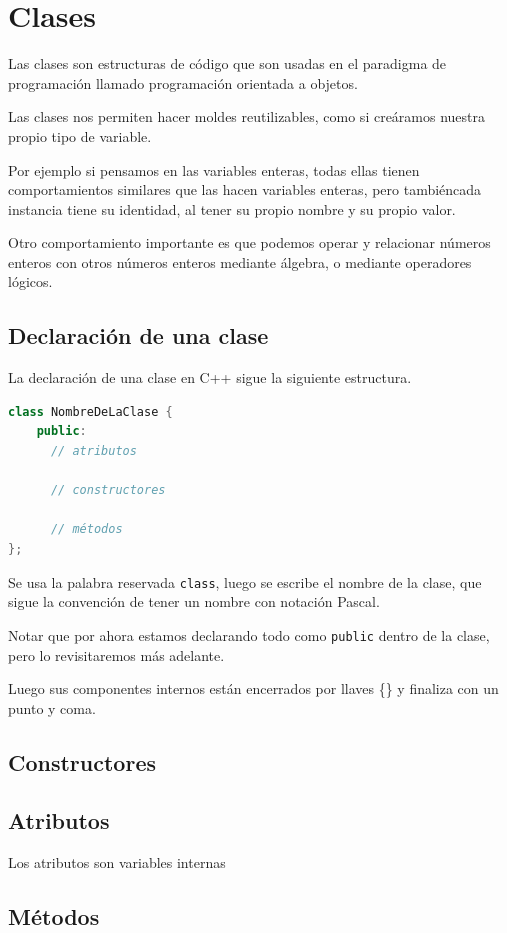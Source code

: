 \documentclass[../principal.tex]{subfiles}
\begin{document}
\chapter{Clases}

Las clases son estructuras de código que son usadas en el paradigma de programación llamado programación orientada a objetos.

Las clases nos permiten hacer moldes reutilizables, como si creáramos nuestra propio tipo de variable.

Por ejemplo si pensamos en las variables enteras, todas ellas tienen comportamientos similares que las hacen variables enteras, pero tambiéncada instancia tiene su identidad, al tener su propio nombre y su propio valor.

Otro comportamiento importante es que podemos operar y relacionar números enteros con otros números enteros mediante álgebra, o mediante operadores lógicos.

\section{Declaración de una clase}

La declaración de una clase en C++ sigue la siguiente estructura.

\begin{lstlisting}[language=C++]
class NombreDeLaClase {
    public:
      // atributos

      // constructores

      // métodos
};
\end{lstlisting}

Se usa la palabra reservada \lstinline{class}, luego se escribe el nombre de la clase, que sigue la convención de tener un nombre con notación Pascal.

Notar que por ahora estamos declarando todo como \lstinline{public} dentro de la clase, pero lo revisitaremos más adelante.

Luego sus componentes internos están encerrados por llaves \{\} y finaliza con un punto y coma.

\section{Constructores}

\section{Atributos}

Los atributos son variables internas

\section{Métodos}


\newpage
\end{document}
